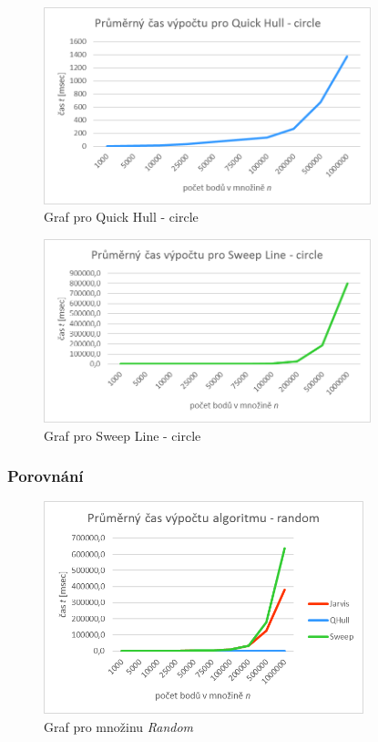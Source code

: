 \documentclass[a4paper, 12pt]{article}
\begin{document}
\begin{figure}[h!]
	\centering
	\includegraphics[width=9.5cm]{./pictures/g_circ_qh.png}
	\caption{Graf pro Quick Hull - circle}
\end{figure}

\begin{figure}[h!]
	\centering
	\includegraphics[width=9.5cm]{./pictures/g_circ_sl.png}
	\caption{Graf pro Sweep Line - circle}
\end{figure}
\clearpage

\subsubsection{Porovnání}
\begin{figure}[h!]
	\centering
	\includegraphics[width=9.3cm]{./pictures/g_rand_all.png}
	\caption{Graf pro množinu \textit{Random}}
\end{figure}
\end{document}

